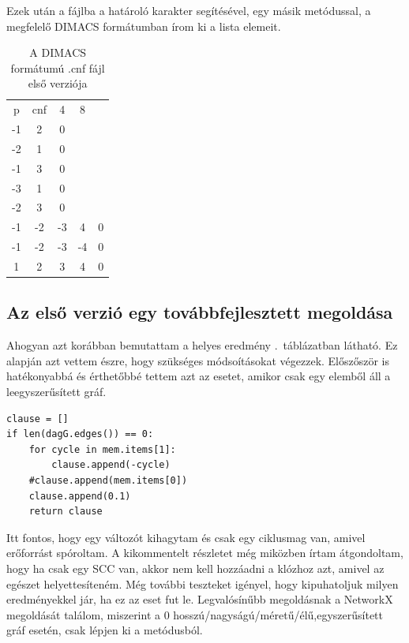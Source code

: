 \documentclass[
]{thesis-ekf}
\theoremstyle{definition}
\theoremstyle{remark}
\begin{document}
	Ezek után a fájlba a határoló karakter segítésével, egy másik metódussal, a megfelelő \textsc{DIMACS} formátumban írom ki a lista elemeit.

	\begin{table}[h!]
		\centering
		\begin{tabular}{ccccc}
		p & cnf & 4 & 8 &   \\
		-1 &  2 &  0 & &\\
		-2 &  1 &  0 & &\\
		-1 &  3 &  0 & &\\
		-3 &  1 &  0 & &\\
		-2 &  3 &  0 & &\\
		-1 & -2 & -3 &  4 & 0\\
		-1 & -2 & -3 & -4 & 0\\
		 1 &  2 &  3 &  4 & 0\\
		\end{tabular}
		\caption{A \textsc{DIMACS} formátumú .cnf fájl első verziója}
	\end{table}
	
	\subsection{Az első verzió egy továbbfejlesztett megoldása}
	
	Ahogyan azt korábban bemutattam a helyes eredmény \az{\ref{table-esm-cnf}}.~táblázatban látható. Ez alapján azt vettem észre, hogy szükséges módsoításokat végezzek. Előszőször is hatékonyabbá és érthetőbbé tettem azt az esetet, amikor csak egy elemből áll a leegyszerűsített gráf.
	\begin{lstlisting}
clause = []
if len(dagG.edges()) == 0:
	for cycle in mem.items[1]:
		clause.append(-cycle)
	#clause.append(mem.items[0])
	clause.append(0.1)
	return clause
	\end{lstlisting}
	
	Itt fontos, hogy egy változót kihagytam és csak egy ciklusmag van, amivel erőforrást spóroltam. A kikommentelt részletet még miközben írtam átgondoltam, hogy ha csak egy SCC van, akkor nem kell hozzáadni a klózhoz azt, amivel az egészet helyettesíteném. Még további teszteket igényel, hogy kipuhatoljuk milyen eredményekkel jár, ha ez az eset fut le. Legvalósínűbb megoldásnak a NetworkX megoldását találom, miszerint a 0 hosszú/nagyságú/méretű/élű,egyszerűsített gráf esetén, csak lépjen ki a metódusból.
	
\end{document}
